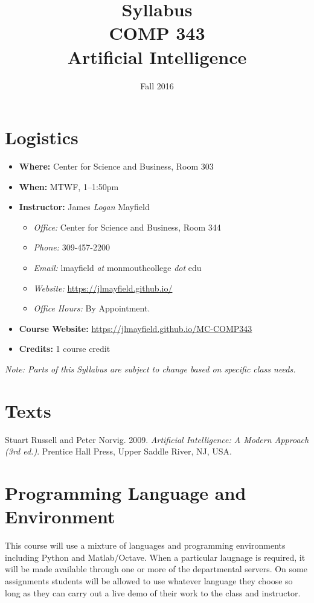 \documentclass[10pt]{article}
\title{Syllabus \\ COMP 343 \\ Artificial Intelligence}
\author{  }
\date{Fall 2016}
\begin{document}
\maketitle

\section{Logistics}
\begin{itemize}
\item \textbf{Where: } Center for Science and Business, Room 303
\item \textbf{When: } MTWF,  1--1:50pm
\item \textbf{Instructor:} James \textit{Logan} Mayfield
\begin{itemize}
\item \textit{Office: } Center for Science and Business, Room 344
\item \textit{Phone: } 309-457-2200 %
\item \textit{Email: } lmayfield \textit{at} monmouthcollege \textit{dot} edu
\item \textit{Website: } \url{https://jlmayfield.github.io/}
\item \textit{Office Hours: } By Appointment.
\end{itemize}
\item \textbf{Course Website: } \url{https://jlmayfield.github.io/MC-COMP343}
\item \textbf{Credits: } 1 course credit
\end{itemize}
\emph{Note: Parts of this Syllabus are subject to change based on specific class needs.}

\section{Texts}

\noindent Stuart Russell and Peter Norvig. 2009. \textit{Artificial Intelligence: A Modern Approach (3rd ed.)}. Prentice Hall Press, Upper Saddle River, NJ, USA\@.

\section{Programming Language and Environment}

This course will use a mixture of languages and programming environments including Python and Matlab/Octave. When a particular laugnage is required, it will be made available through one or more of the departmental servers. On some assignments students will be allowed to use whatever language they choose so long as they can carry out a live demo of their work to the class and instructor.
\end{document}
